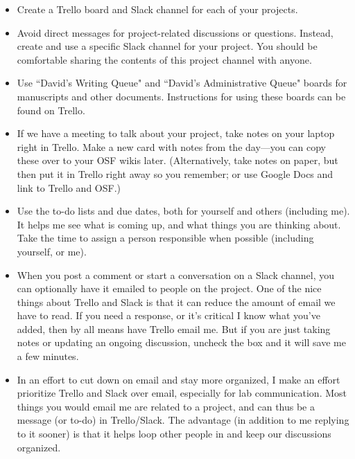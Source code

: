 \documentclass[letterpaper,12pt,oneside]{memoir}
\begin{document}
\begin{itemize}
\item Create a Trello board and Slack channel for each of your projects.

\item Avoid direct messages for project-related discussions or questions. Instead, create and use a specific Slack channel for your project. You should be comfortable sharing the contents of this project channel with anyone.

\item Use ``David's Writing Queue" and ``David's Administrative Queue" boards for manuscripts and other documents. Instructions for using these boards can be found on Trello.

\item If we have a meeting to talk about your project, take notes on your laptop right in Trello. Make a new card with notes from the day---you can copy these over to your OSF wikis later. (Alternatively, take notes on paper, but then put it in Trello right away so you remember; or use Google Docs and link to Trello and OSF.)

\item Use the to-do lists and due dates, both for yourself and others (including me). It helps me see what is coming up, and what things you are thinking about. Take the time to assign a person responsible when possible (including yourself, or me).

\item When you post a comment or start a conversation on a Slack channel, you can optionally have it emailed to people on the project. One of the nice things about Trello and Slack is that it can reduce the amount of email we have to read. If you need a response, or it's critical I know what you've added, then by all means have Trello email me. But if you are just taking notes or updating an ongoing discussion, uncheck the box and it will save me a few minutes.

\item In an effort to cut down on email and stay more organized, I make an effort prioritize Trello and Slack over email, especially for lab communication. Most things you would email me are related to a project, and can thus be a message (or to-do) in Trello/Slack. The advantage (in addition to me replying to it sooner) is that it helps loop other people in and keep our discussions organized. 

\end{itemize}
\end{document}

